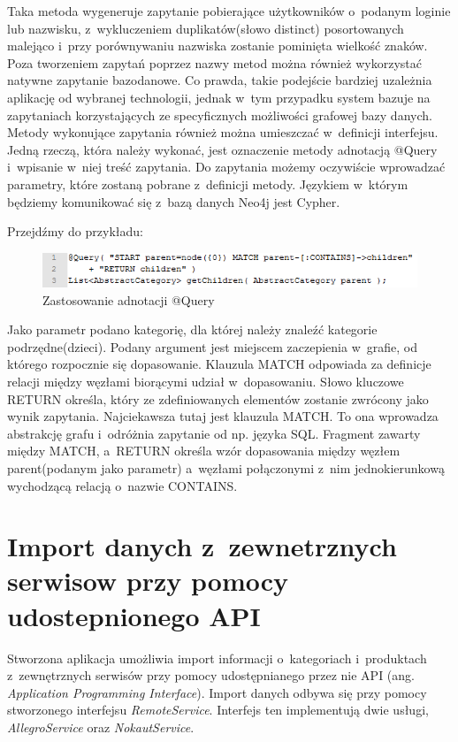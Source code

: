 Taka metoda wygeneruje zapytanie pobierające użytkowników o~podanym loginie lub nazwisku, z~wykluczeniem duplikatów(słowo distinct) posortowanych malejąco i~przy porównywaniu nazwiska zostanie pominięta wielkość znaków. 
Poza tworzeniem zapytań poprzez nazwy metod można również wykorzystać natywne zapytanie bazodanowe. Co prawda, takie podejście bardziej uzależnia aplikację od wybranej technologii, jednak w~tym przypadku system bazuje na zapytaniach korzystających ze specyficznych możliwości grafowej bazy danych. Metody wykonujące zapytania również można umieszczać w~definicji interfejsu. Jedną rzeczą, która należy wykonać, jest oznaczenie metody adnotacją @Query i~wpisanie w~niej treść zapytania. Do zapytania możemy oczywiście wprowadzać parametry, które zostaną pobrane z~definicji metody. Językiem w~którym będziemy komunikować się z~bazą danych Neo4j jest Cypher. 

Przejdźmy do przykładu:

\begin{figure}[H]
	\centering
	\includegraphics{images/query.png}
	\caption{Zastosowanie adnotacji @Query}
\end{figure}

Jako parametr podano kategorię, dla której należy znaleźć kategorie podrzędne(dzieci). Podany argument jest miejscem zaczepienia w~grafie, od którego rozpocznie się dopasowanie. Klauzula MATCH odpowiada za definicje relacji między węzłami biorącymi udział w~dopasowaniu. Słowo kluczowe RETURN określa, który ze zdefiniowanych elementów zostanie zwrócony jako wynik zapytania. Najciekawsza tutaj jest klauzula MATCH. To ona wprowadza abstrakcję grafu i~odróżnia zapytanie od np. języka SQL. Fragment zawarty między MATCH, a~RETURN określa wzór dopasowania między węzłem parent(podanym jako parametr) a~węzłami połączonymi z~nim jednokierunkową wychodzącą relacją o~nazwie CONTAINS. 

\section{Import danych z~zewnetrznych serwisow przy pomocy udostepnionego API}

Stworzona aplikacja umożliwia import informacji o~kategoriach i~produktach z~zewnętrznych serwisów przy pomocy udostępnianego przez nie API (ang. \textit{Application Programming Interface}). Import danych odbywa się przy pomocy stworzonego interfejsu \textit{RemoteService}. Interfejs ten implementują dwie usługi, \textit{AllegroService} oraz \textit{NokautService}.

